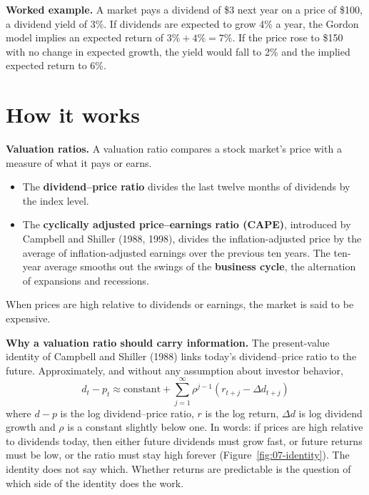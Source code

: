 \textbf{Worked example.} A market pays a dividend of \$3 next year on a price of \$100, a dividend yield of 3\%. If dividends are expected to grow 4\% a year, the Gordon model implies an expected return of $3\% + 4\% = 7\%$. If the price rose to \$150 with no change in expected growth, the yield would fall to 2\% and the implied expected return to 6\%.

\section{How it works}
\label{sec:07-how}

\textbf{Valuation ratios.} A valuation ratio compares a stock market's price with a measure of what it pays or earns.

\begin{itemize}
  \item The \textbf{dividend--price ratio} divides the last twelve months of dividends by the index level.
  \item The \textbf{cyclically adjusted price--earnings ratio (CAPE)}, introduced by Campbell and Shiller (1988, 1998), divides the inflation-adjusted price by the average of inflation-adjusted earnings over the previous ten years. The ten-year average smooths out the swings of the \textbf{business cycle}, the alternation of expansions and recessions.
\end{itemize}

When prices are high relative to dividends or earnings, the market is said to be expensive.

\textbf{Why a valuation ratio should carry information.} The present-value identity of Campbell and Shiller (1988) links today's dividend--price ratio to the future. Approximately, and without any assumption about investor behavior,
\begin{equation}
  d_t - p_t \approx \text{constant} + \sum_{j=1}^{\infty} \rho^{j-1}\left(r_{t+j} - \Delta d_{t+j}\right)
  \label{eq:07-identity}
\end{equation}
where $d - p$ is the log dividend--price ratio, $r$ is the log return, $\Delta d$ is log dividend growth and $\rho$ is a constant slightly below one. In words: if prices are high relative to dividends today, then either future dividends must grow fast, or future returns must be low, or the ratio must stay high forever (Figure~\ref{fig:07-identity}). The identity does not say which. Whether returns are predictable is the question of which side of the identity does the work.

